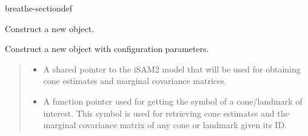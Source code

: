 \documentclass[letterpaper,10pt,english]{sphinxmanual}
\begin{document}
\begin{fulllineitems}
\begin{sphinxuseclass}{breathe-sectiondef}
\begin{fulllineitems}
\label{\detokenize{isam2:_CPPv4N4slam14SLAMEstAndMCov14SLAMEstAndMCovENSt10shared_ptrIN5gtsam5ISAM2EEEPFN5gtsam6SymbolEiENSt6size_tENSt6size_tE}}\label{\detokenize{isam2:_CPPv3N4slam14SLAMEstAndMCov14SLAMEstAndMCovENSt10shared_ptrIN5gtsam5ISAM2EEEPFN5gtsam6SymbolEiENSt6size_tENSt6size_tE}}\label{\detokenize{isam2:_CPPv2N4slam14SLAMEstAndMCov14SLAMEstAndMCovENSt10shared_ptrIN5gtsam5ISAM2EEEPFN5gtsam6SymbolEiENSt6size_tENSt6size_tE}}
\pysigstartsignatures
\pysigstartmultiline
\pysiglinewithargsret
{\label{\detokenize{isam2:classslam_1_1SLAMEstAndMCov_1a84beb5098e3d71eb9fbe802a16cbad23}}}
{\sphinxparamcomma {}\sphinxparamcomma {}\sphinxparamcomma {}}
{}
\pysigstopmultiline
\pysigstopsignatures
\sphinxAtStartPar
Construct a new {\hyperref[\detokenize{isam2:classslam_1_1SLAMEstAndMCov_1a84beb5098e3d71eb9fbe802a16cbad23}]{}} object. 

\sphinxAtStartPar
Construct a new {\hyperref[\detokenize{isam2:classslam_1_1SLAMEstAndMCov}]{}} object with configuration parameters.
\begin{quote}\begin{description}
\begin{itemize}
\item {} 
\sphinxAtStartPar
{} \textendash{} A shared pointer to the iSAM2 model that will be used for obtaining cone estimates and marginal covariance matrices.

\item {} 
\sphinxAtStartPar
{} \textendash{} A function pointer used for getting the symbol of a cone/landmark of interest. This symbol is used for retrieving cone estimates and the marginal covariance matrix of any cone or landmark given its ID.


\end{itemize}
\end{description}
\end{quote}
\end{fulllineitems}
\end{sphinxuseclass}
\end{fulllineitems}
\end{document}
